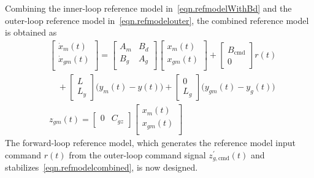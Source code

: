 \documentclass[journal]{IEEEtran}
\theoremstyle{innercustomthm}
\begin{document}
  Combining the inner-loop reference model in\ \eqref{eqn.refmodelWithBd} and the outer-loop reference model in\ \eqref{eqn.refmodelouter}, the combined reference model is obtained as
  {%
    \small
    \begin{equation}
      \label{eqn.refmodelcombined}
      \begin{split}
        &
        \begin{bmatrix}
          \dot{x}_{m}(t) \\
          \dot{x}_{gm}(t) \\
        \end{bmatrix}
        =
        \begin{bmatrix}
          A_{m} & B_{d} \\
          B_{g} & A_{g} \\
        \end{bmatrix}
        \begin{bmatrix}
          x_{m}(t) \\
          x_{gm}(t) \\
        \end{bmatrix}
        +
        \begin{bmatrix}
          B_{\text{cmd}} \\
          0
        \end{bmatrix} r(t) \\
        & \quad +
        \begin{bmatrix}
          L \\
          L_{y}
        \end{bmatrix}\bigr(y_{m}(t)-y(t)\bigr)
        +
        \begin{bmatrix}
          0 \\
          L_{g}
        \end{bmatrix}\bigr(y_{gm}(t)-y_{g}(t)\bigr) \\
        &
        z_{gm}(t) =
        \begin{bmatrix}
          0 & C_{gz}
        \end{bmatrix}
        \begin{bmatrix}
          x_{m}(t) \\
          x_{gm}(t) \\
        \end{bmatrix}
      \end{split}
    \end{equation}
  }%
  The forward-loop reference model, which generates the reference model input command $r(t)$ from the outer-loop command signal $z_{g,\text{cmd}}^{\prime}(t)$ and stabilizes\ \eqref{eqn.refmodelcombined}, is now designed.
\end{document}
